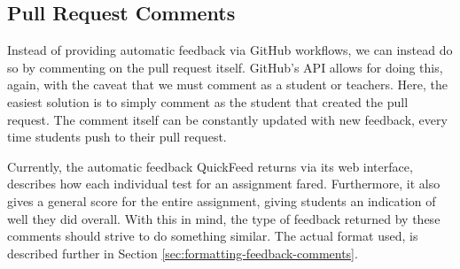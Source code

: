 \subsection{Pull Request Comments}

Instead of providing automatic feedback via GitHub workflows, we can instead do so by commenting on the pull request itself.
GitHub's API allows for doing this, again, with the caveat that we must comment as a student or teachers.
Here, the easiest solution is to simply comment as the student that created the pull request.
The comment itself can be constantly updated with new feedback, every time students push to their pull request.

Currently, the automatic feedback QuickFeed returns via its web interface, describes how each individual test for an assignment fared.
Furthermore, it also gives a general score for the entire assignment, giving students an indication of well they did overall.
With this in mind, the type of feedback returned by these comments should strive to do something similar.
The actual format used, is described further in Section \ref{sec:formatting-feedback-comments}.
